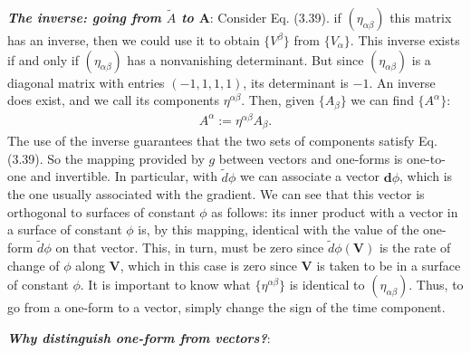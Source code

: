 \documentclass[12pt]{book}
\begin{document}
    \textit{\textbf{The inverse: going from $\tilde{A}$ to $\mathbf{A}$}}: Consider Eq. (3.39). if \((\eta_{\alpha\beta})\) this matrix has an inverse, then we could use it to obtain \(\{V^\beta\}\) from \(\{V_\alpha\}\). This inverse exists if and only if \((\eta_{\alpha\beta})\) has a nonvanishing determinant. But since \((\eta_{\alpha\beta})\) is a diagonal matrix with entries \((-1, 1, 1, 1)\), its determinant is \(-1\). An inverse does exist, and we call its components \(\eta^{\alpha\beta}\). Then, given \(\{A_\beta\}\) we can find \(\{A^\alpha\}\):
    \begin{align}
    A^\alpha := \eta^{\alpha\beta}A_\beta. \tag{3.43}
    \end{align}
    The use of the inverse guarantees that the two sets of components satisfy Eq. (3.39). So the mapping provided by \(g\) between vectors and one-forms is one-to-one and invertible. 
    In particular, with \(\tilde{d}\phi\) we can associate a vector \(\mathbf{d}\phi\), which is the one usually associated with the gradient. We can see that this vector is orthogonal to surfaces of constant \(\phi\) as follows: its inner product with a vector in a surface of constant \(\phi\) is, by this mapping, identical with the value of the one-form \(\tilde{d}\phi\) on that vector. This, in turn, must be zero since \(\tilde{d}\phi(\mathbf{V})\) is the rate of change of \(\phi\) along \(\mathbf{V}\), which in this case is zero since \(\mathbf{V}\) is taken to be in a surface of constant \(\phi\).
    It is important to know what \(\{\eta^{\alpha\beta}\}\) is identical to \((\eta_{\alpha\beta})\). Thus, to go from a one-form to a vector, simply change the sign of the time component.
    
    \textit{\textbf{Why distinguish one-form from vectors?}}: 
    
\end{document}

